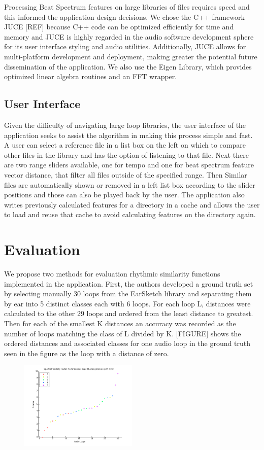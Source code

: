 \documentclass{article}
\begin{document}
Processing Beat Spectrum features on large libraries of files requires speed and this informed the application design decisions. We chose the C++ framework JUCE [REF] because C++ code can be optimized efficiently for time and memory and JUCE is highly regarded in the audio software development sphere for its user interface styling and audio utilities. Additionally, JUCE allows for multi-platform development and deployment, making greater the potential future dissemination of the application. We also use the Eigen Library, which provides optimized linear algebra routines and an FFT wrapper.

\subsection{User Interface}
Given the difficulty of navigating large loop libraries, the user interface of the application seeks to assist the algorithm in making this process simple and fast. A user can select a reference file in a list box on the left on which to compare other files in the library and has the option of listening to that file. Next there are two range sliders available, one for tempo and one for beat spectrum feature vector distance, that filter all files outside of the specified range. Then Similar files are automatically shown or removed in a left list box according to the slider positions and those can also be played back by the user. The application also writes previously calculated features for a directory in a cache and allows the user to load and reuse that cache to avoid calculating features on the directory again.


\section{Evaluation}
We propose two methods for evaluation rhythmic similarity functions implemented in the application. First, the authors developed a ground truth set by selecting manually 30 loops from the EarSketch library and separating them by ear into 5 distinct classes each with 6 loops. For each loop L, distances were calculated to the other 29 loops and ordered from the least distance to greatest. Then for each of the smallest K distances an accuracy was recorded as the number of loops matching the class of L divided by K. [FIGURE] shows the ordered distances and associated classes for one audio loop in the ground truth seen in the figure as the loop with a distance of zero.

\begin{figure}[h!]
  \centering
    \includegraphics[width=0.5\textwidth]{distance_graph_eval1.png}
      \caption{}
\end{figure}
\end{document}
